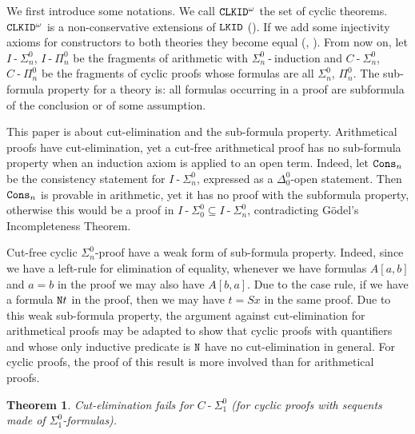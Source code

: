 \documentclass[a4paper,12pt]{article}
\newtheorem{theorem}{Theorem}[section]
\newcommand{\Nat}               { {\tt N}  }
\newcommand{\Cons}            { {\tt Cons} }
\newcommand{\hy}        { {\operatorname{-}}}
\newcommand{\LKID} { {\tt LKID} }
\newcommand{\CLKID} { {\tt CLKID} }
\begin{document}
We first introduce some notations. We call $\CLKID^\omega$ the set of cyclic theorems. $\CLKID^\omega$ is a non-conservative extensions of $\LKID$ (\cite{FOSSACS2017}). If we add some injectivity axioms for constructors to both theories they become equal (\cite{Simpson2017}, \cite{LICS2017}). From now on, let $I\hy \Sigma^0_n$, $I\hy \Pi^0_n$ be the fragments of arithmetic with $\Sigma^0_n\hy $induction and $C\hy \Sigma^0_n$, $C\hy \Pi^0_n$ be the fragments of cyclic proofs whose formulas are all $\Sigma^0_n$, $\Pi^0_n$. The sub-formula property for a theory is: all formulas occurring in a proof are subformula of the conclusion or of some assumption.

This paper is about cut-elimination and the sub-formula property. Arithmetical proofs have cut-elimination, yet a cut-free arithmetical proof has no sub-formula property when an induction axiom is applied to an open term. Indeed, let $\Cons_n$ be the consistency statement for $I\hy \Sigma^0_n$, expressed as a $\Delta^0_0$-open statement. Then $\Cons_n$ is provable in arithmetic, yet it has no proof with the subformula property, otherwise this would be a proof in $I\hy \Sigma^0_0 \subseteq I\hy \Sigma^0_n$, contradicting G\"{o}del's Incompleteness Theorem. 

Cut-free cyclic $\Sigma^0_n$-proof have a weak form of sub-formula property. Indeed, since we have a left-rule for elimination of equality, whenever we have formulas $A[a,b]$ and $a=b$ in the proof we may also have $A[b,a]$. Due to the case rule, if we have a formula $\Nat t$ in the proof, then we may have $t = Sx$ in the same proof. Due to this weak sub-formula property, the argument against cut-elimination for arithmetical proofs may be adapted to show that cyclic proofs with quantifiers and whose only inductive predicate is $\Nat$ have no cut-elimination in general. For cyclic proofs, the proof of this result is more involved than for arithmetical proofs. 

\begin{theorem}
Cut-elimination fails for $C\hy \Sigma^0_{1}$ (for cyclic proofs with sequents made of $\Sigma^0_1$-formulas).
\end{theorem}
\end{document}
